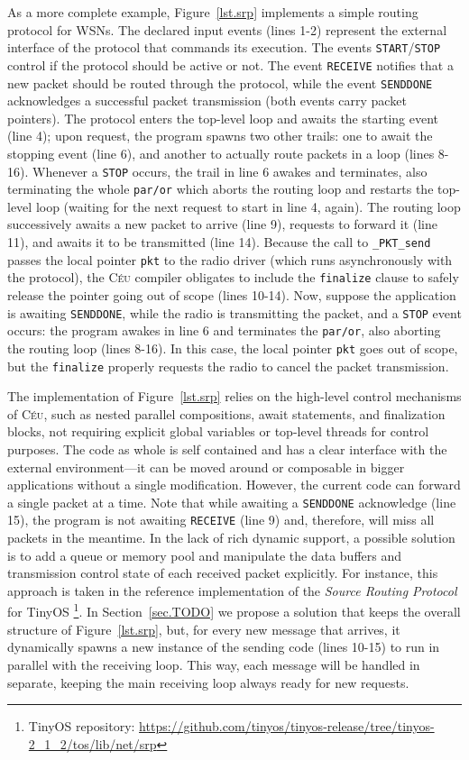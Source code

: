 \documentclass{sig-alternate-ipsn13}
\newcommand{\CEU}{\textsc{C\'{e}u}\xspace}
\newcommand{\code}[1] {{\small{\texttt{#1}}}}
\begin{document}
As a more complete example, Figure~\ref{lst.srp} implements a simple routing 
protocol for WSNs.
%
The declared input events (lines 1-2) represent the external interface of the 
protocol that commands its execution.
The events \code{START}/\code{STOP} control if the protocol should be active or 
not.
The event \code{RECEIVE} notifies that a new packet should be routed through 
the protocol, while the event \code{SENDDONE} acknowledges a successful packet 
transmission (both events carry packet pointers).
%
The protocol enters the top-level loop and awaits the starting event (line
4);
upon request, the program spawns two other trails:
one to await the stopping event (line 6),
and another to actually route packets in a loop (lines 8-16).
%
Whenever a \code{STOP} occurs, the trail in line 6 awakes and terminates, also 
terminating the whole \code{par/or} which aborts the routing loop and restarts 
the top-level loop (waiting for the next request to start in line 4, again).
%
The routing loop successively awaits a new packet to arrive (line 9), requests 
to forward it (line 11), and awaits it to be transmitted (line 14).
%
Because the call to \code{\_PKT\_send} passes the local pointer \code{pkt} to 
the radio driver (which runs asynchronously with the protocol), the \CEU 
compiler obligates to include the \code{finalize} clause to safely release the 
pointer going out of scope (lines 10-14).
Now, suppose the application is awaiting \code{SENDDONE}, while the radio is 
transmitting the packet, and a \code{STOP} event occurs:
the program awakes in line 6 and terminates the \code{par/or}, also aborting 
the routing loop (lines 8-16).
In this case, the local pointer \code{pkt} goes out of scope, but the 
\code{finalize} properly requests the radio to cancel the packet transmission.

The implementation of Figure~\ref{lst.srp} relies on the high-level control 
mechanisms of \CEU, such as nested parallel compositions, await statements, and
finalization blocks, not requiring explicit global variables or top-level 
threads for control purposes.
%
The code as whole is self contained and has a clear interface with the external 
environment---it can be moved around or composable in bigger applications 
without a single modification.
%
However, the current code can forward a single packet at a time.
Note that while awaiting a \code{SENDDONE} acknowledge (line 15), the program 
is not awaiting \code{RECEIVE} (line 9) and, therefore, will miss all packets 
in the meantime.
%
In the lack of rich dynamic support, a possible solution is to add a queue or 
memory pool and manipulate the data buffers and transmission control state of 
each received packet explicitly.
For instance, this approach is taken in the reference implementation of the 
\emph{Source Routing Protocol} for TinyOS%
\footnote{TinyOS repository: 
\url{https://github.com/tinyos/tinyos-release/tree/tinyos-2_1_2/tos/lib/net/srp}}.
%
In Section~\ref{sec.TODO} we propose a solution that keeps the overall 
structure of Figure~\ref{lst.srp}, but, for every new message that arrives, it 
dynamically spawns a new instance of the sending code (lines 10-15) to run in 
parallel with the receiving loop.
This way, each message will be handled in separate, keeping the main receiving 
loop always ready for new requests.
\end{document}
